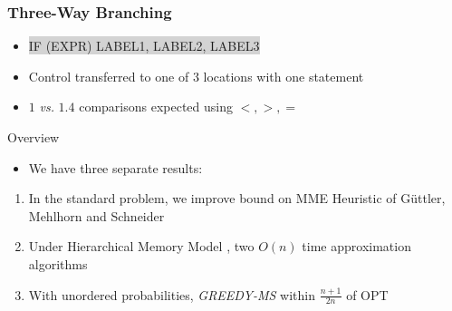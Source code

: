 \documentclass{beamer}
\theoremstyle{plain}
\begin{document}
\begin{frame} \frametitle{Three-Way Branching}

\begin{center}
\end{center}

\begin{itemize}



\item {} %
\colorbox{lightgrey}{ \selectfont \uppercase{IF (expr) label1, label2, label3} } 

\item Control transferred to one of $3$ locations with one statement

\item $1$ \textit{vs.} $1.4$ comparisons expected using $<, >, =$
\end{itemize}
\end{frame}


\begin{frame}{Overview}

\begin{itemize}

\item We have three separate results:
\end{itemize}

\begin{enumerate}
\item In the standard problem, we improve bound on MME Heuristic of G{\"u}ttler, Mehlhorn and Schneider \cite{guttler1980binary}

\item Under Hierarchical Memory Model \cite{aggarwal1987model}, two $O(n)$ time approximation algorithms

\item With unordered probabilities, \textit{GREEDY-MS} within $\frac{n+1}{2n}$ of OPT
\end{enumerate}




\end{frame}
\end{document}
